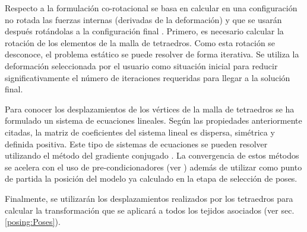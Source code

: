 
Respecto a la formulación co-rotacional se basa en calcular en una configuración no rotada las fuerzas internas (derivadas de la deformación) y que se usarán después rotándolas a la configuración final \cite{Muller2004}. Primero, es necesario calcular la rotación de los elementos de la malla de tetraedros. Como esta rotación se desconoce, el problema estático se puede resolver de forma iterativa. Se utiliza la deformación seleccionada por el usuario como situación inicial para reducir significativamente el número de iteraciones requeridas para llegar a la solución final.  %

Para conocer los desplazamientos de los vértices de la malla de tetraedros se ha formulado un sistema de ecuaciones lineales. Según las propiedades anteriormente citadas, la matriz de coeficientes del sistema lineal es dispersa, simétrica y definida positiva. Este tipo de sistemas de ecuaciones se pueden resolver utilizando el método del gradiente conjugado \cite{Press2007}. La convergencia de estos métodos se acelera con el uso de pre-condicionadores (ver \cite{hauth2003}) además de utilizar como punto de partida la posición del modelo ya calculado en la etapa de selección de poses. %

Finalmente, se utilizarán los desplazamientos realizados por los tetraedros para calcular la transformación que se aplicará a todos los tejidos asociados (ver sec. \ref{posing:Poses}). 



